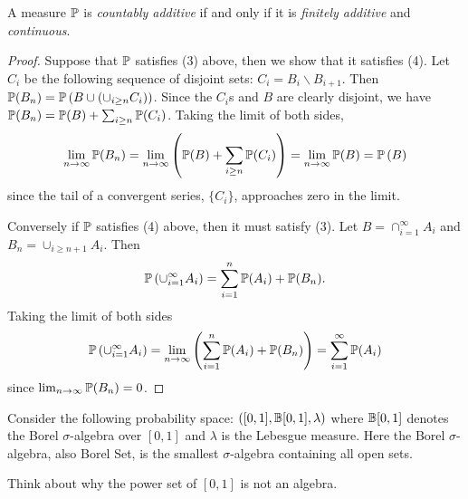 \documentclass[11pt]{article}
\begin{document}
	\begin{claim}
		A measure $\mathbb{P}$ is \emph{countably additive} if and only if it is \emph{finitely additive} and \emph{continuous}. 
	\end{claim}
	\begin{proof}
		Suppose that $\mathbb{P}$ satisfies (3) above, then we show that it satisfies (4). Let $C_i$ be the following sequence of disjoint sets: $C_i = B_i \backslash B_{i+1}$. Then $\mathbb{P}(B_n) = \mathbb{P}\left(B \cup (\cup_{i \geq n}C_i)\right)$. Since the $C_i$s and $B$ are clearly disjoint, we have $\mathbb{P}(B_n) = \mathbb{P}(B) + \sum_{i\geq n}\mathbb{P}(C_i)$. Taking the limit of both sides,
		\[\lim_{n\rightarrow\infty}\mathbb{P}(B_n) = \lim_{n\rightarrow\infty}\left(\mathbb{P}(B) + \sum_{i \geq n}\mathbb{P}(C_i)\right) = \lim_{n\rightarrow\infty}\mathbb{P}(B) = \mathbb{P}\left(B\right)\]
		since the tail of a convergent series, $\{C_i\}$, approaches zero in the limit.  
		
		Conversely if $\mathbb{P}$ satisfies (4) above, then it must satisfy (3). Let $B = \cap_{i=1}^{\infty}A_i$ and $B_{n} = \cup_{i\geq n+1} A_{i}$. Then 
		\[\mathbb{P}\left(\cup_{i=1}^{\infty}A_i\right) = \sum_{i=1}^{n}\mathbb{P}(A_i) + \mathbb{P}(B_{n}).\]
		Taking the limit of both sides
		\[\mathbb{P}\left(\cup_{i=1}^{\infty}A_i\right) = \lim_{n\rightarrow \infty}\left(\sum_{i=1}^{n}\mathbb{P}(A_i) + \mathbb{P}(B_{n})\right) = \sum_{i=1}^{\infty}\mathbb{P}(A_i)\]
		since $\lim_{n\rightarrow\infty}\mathbb{P}(B_n) = 0$. 
	\end{proof}
	
	\begin{example}
		Consider the following probability space: $\left([0,1], \mathbb{B}[0,1], \lambda\right)$ where $\mathbb{B}[0,1]$ denotes the Borel $\sigma$-algebra over $[0,1]$ and $\lambda$ is the Lebesgue measure. Here the Borel $\sigma$-algebra, also Borel Set, is the smallest $\sigma$-algebra containing all open sets.  
		
		Think about why the power set of $[0,1]$ is not an algebra. 
	\end{example}
\end{document}
